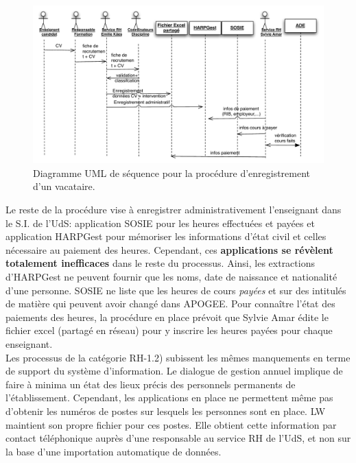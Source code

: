 \documentclass{book}
\begin{document}
\begin{figure}[hbt]
\begin{center}
\includegraphics[width=\linewidth]{figs/rh_seq_vacataires.pdf}
\end{center}
\caption{Diagramme UML de séquence pour la procédure d'enregistrement d'un vacataire.}
\label{fg:rh_seq_vacataires}
\end{figure}

Le reste de la procédure vise à enregistrer administrativement l'enseignant
dans le S.I. de l'UdS: application SOSIE pour les heures effectuées et payées
et application HARPGest pour mémoriser les informations d'état civil et celles
nécessaire au paiement des heures. 
Cependant, ces \textbf{applications se révèlent totalement inefficaces} dans 
le reste du processus. Ainsi, les extractions d'HARPGest ne peuvent fournir
que les noms, date de naissance et nationalité d'une personne. SOSIE ne liste
que les heures de cours \emph{payées} et sur des intitulés de matière qui
peuvent avoir changé dans APOGEE.
Pour connaître l'état des paiements des heures, la procédure en place prévoit
que Sylvie Amar édite le fichier excel (partagé en réseau) pour y inscrire 
les heures payées pour chaque enseignant.\\

Les processus de la catégorie RH-1.2) subissent les mêmes manquements en terme
de support du système d'information. Le dialogue de gestion annuel implique
de faire à minima un état des lieux précis des personnels permanents de 
l'établissement. Cependant, les applications en place ne permettent même pas
d'obtenir les numéros de postes sur lesquels les personnes sont en place.
LW maintient son propre fichier pour ces postes. Elle obtient cette information
par contact téléphonique auprès d'une responsable au service RH de l'UdS, et
non sur la base d'une importation automatique de données.\\
\end{document}
